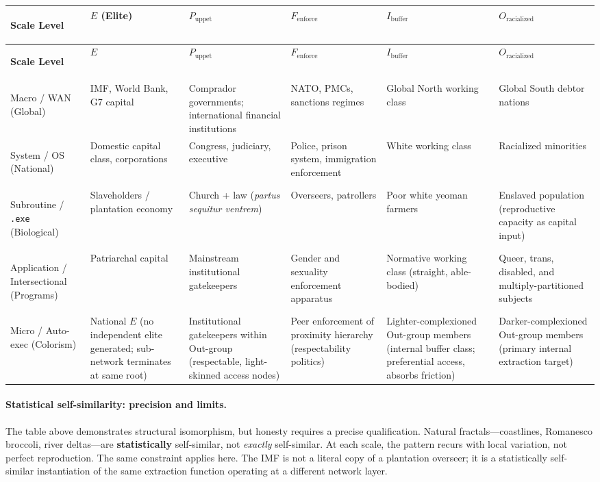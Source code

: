 \documentclass[12pt,openany]{book}
\begin{document}
\begin{longtable}{>{\bfseries\raggedright}p{2.3cm} >{\raggedright}p{2.0cm} >{\raggedright}p{2.0cm} >{\raggedright}p{2.2cm} >{\raggedright}p{2.2cm} >{\raggedright\arraybackslash}p{2.3cm}}
\toprule
\textbf{Scale Level} & \textbf{$E$ (Elite)} & \textbf{$P_{\text{uppet}}$} & \textbf{$F_{\text{enforce}}$} & \textbf{$I_{\text{buffer}}$} & \textbf{$O_{\text{racialized}}$} \\
\midrule
\endfirsthead
\toprule
\textbf{Scale Level} & \textbf{$E$} & \textbf{$P_{\text{uppet}}$} & \textbf{$F_{\text{enforce}}$} & \textbf{$I_{\text{buffer}}$} & \textbf{$O_{\text{racialized}}$} \\
\midrule
\endhead
Macro / WAN (Global) &
IMF, World Bank, G7 capital &
Comprador governments; international financial institutions &
NATO, PMCs, sanctions regimes &
Global North working class &
Global South debtor nations \\
\midrule
System / OS (National) &
Domestic capital class, corporations &
Congress, judiciary, executive &
Police, prison system, immigration enforcement &
White working class &
Racialized minorities \\
\midrule
Subroutine / \texttt{.exe} (Biological) &
Slaveholders / plantation economy &
Church + law (\textit{partus sequitur ventrem}) &
Overseers, patrollers &
Poor white yeoman farmers &
Enslaved population (reproductive capacity as capital input) \\
\midrule
Application / Intersectional (Programs) &
Patriarchal capital &
Mainstream institutional gatekeepers &
Gender and sexuality enforcement apparatus &
Normative working class (straight, able-bodied) &
Queer, trans, disabled, and multiply-partitioned subjects \\
\midrule
Micro / Auto-exec (Colorism) &
National $E$ (no independent elite generated; sub-network terminates at same root) &
Institutional gatekeepers within Out-group (respectable, light-skinned access nodes) &
Peer enforcement of proximity hierarchy (respectability politics) &
Lighter-complexioned Out-group members (internal buffer class; preferential access, absorbs friction) &
Darker-complexioned Out-group members (primary internal extraction target) \\
\bottomrule
\end{longtable}

\paragraph{Statistical self-similarity: precision and limits.}
The table above demonstrates structural isomorphism, but honesty requires a precise qualification. Natural fractals---coastlines, Romanesco broccoli, river deltas---are \textbf{statistically} self-similar, not \textit{exactly} self-similar. At each scale, the pattern recurs with local variation, not perfect reproduction. The same constraint applies here. The IMF is not a literal copy of a plantation overseer; it is a statistically self-similar instantiation of the same extraction function operating at a different network layer.
\end{document}
